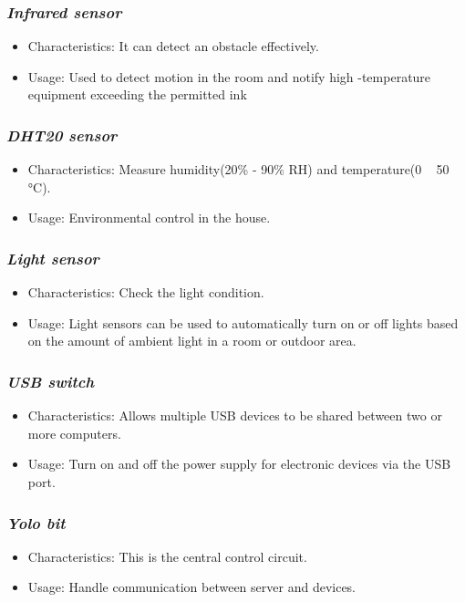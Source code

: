 \documentclass[a4paper, 13pt]{article}
\theoremstyle{definition}
\begin{document}
\subsubsection {\textit{Infrared sensor}}
\begin{itemize}
    \item Characteristics: It can detect an obstacle effectively.
    \item Usage: Used to detect motion in the room and notify high -temperature equipment exceeding the permitted ink
\end{itemize}
\subsubsection {\textit{DHT20 sensor}}
\begin{itemize}
    \item Characteristics: Measure humidity(20\% - 90\% RH) and temperature(0 ~ 50 °C).
    \item Usage: Environmental control in the house.
\end{itemize}
\subsubsection {\textit{Light sensor}}
\begin{itemize}
    \item Characteristics: Check the light condition.
    \item Usage: Light sensors can be used to automatically turn on or off lights based on the amount of ambient light in a room or outdoor area.
\end{itemize}
\subsubsection {\textit{USB switch}}
\begin{itemize}
    \item Characteristics: Allows multiple USB devices to be shared between two or more computers. 
    
    \item Usage: Turn on and off the power supply for electronic devices via the USB port.
\end{itemize}
\subsubsection {\textit{Yolo bit}}
\begin{itemize}
    \item Characteristics: This is the central control circuit.
    \item Usage: Handle communication between server and devices.
\end{itemize}
\end{document}
